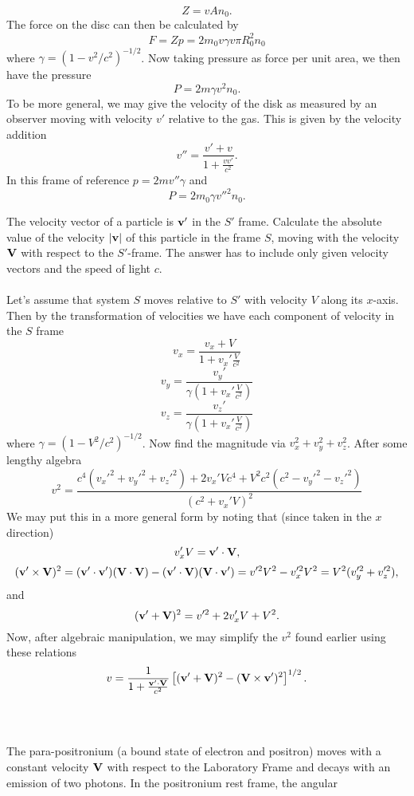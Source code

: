 \documentclass[10pt,letterpaper]{article}
\begin{document}
\[
	Z = vAn_0.
\]
The force on the disc can then be calculated by
\[
	F = Zp = 2m_0v\gamma v\pi R_0^2n_0
\]
where $\gamma = (1-v^2/c^2)^{-1/2}$. Now taking pressure as force per unit area, we then have the pressure
\[
	P = 2m\gamma v^2n_0.
\]
To be more general, we may give the velocity of the disk as measured by an observer moving with velocity $v'$
relative to the gas. This is given by the velocity addition 
\[
	v'' = \frac{v'+v}{1+\frac{vv'}{c^2}}.
\]
In this frame of reference $p = 2mv''\gamma$ and
\[
	P = 2m_0 \gamma v''^2 n_0.
\]
\item
The velocity vector of a particle is $\mathbf{v}'$ in the $S'$ frame. Calculate the absolute value of the velocity 
$|\mathbf{v}|$ of this particle in the frame $S$, moving with the velocity $\mathbf{V}$ with respect to the $S'$-frame. The 
answer has to include only given velocity vectors and the speed of light $c$. 
\\ \\
Let's assume that system $S$ moves relative to $S'$ with velocity $V$ along its $x$-axis. Then by 
the transformation of velocities we have each component of velocity in the $S$ frame
\[
	v_x  = \frac{v_x+V}{1+v_x'\frac{V}{c^2}}
\]
\[
	v_y = \frac{v_y'}{\gamma(1+v_x'\frac{V}{c^2})}
\]
\[
	v_z = \frac{v_z'}{\gamma(1+v_x'\frac{V}{c^2})}
\]
where $\gamma = (1-V^2/c^2)^{-1/2}$. Now find the magnitude via $v_x^2+v_y^2+v_z^2$. After some lengthy
algebra
\[
	v^2 = \frac{c^4(v_x'^2+v_y'^2+v_z'^2)+2v_x'Vc^4+V^2c^2(c^2-v_y'^2-v_z'^2)}{(c^2+v_x'V)^2}
\]
We may put this in a more general form by noting that (since taken in the $x$ direction)
\[
	v_x'V = \mathbf{v}'\cdot \mathbf{V},
\]
\[
	(\mathbf{v}'\times \mathbf{V})^2 = (\mathbf{v}'\cdot\mathbf{v}')(\mathbf{V}\cdot\mathbf{V})-(\mathbf{v}'\cdot\mathbf{V})(\mathbf{V}\cdot
	\mathbf{v}') = v'^2V^2-v_x'^2V^2 = V^2(v_y'^2+v_z'^2),
\]
and
\[
	(\mathbf{v}'+\mathbf{V})^2 = v'^2+2v_x'V+V^2.
\]
Now, after algebraic manipulation, we may simplify the $v^2$ found earlier using these relations
\[
	v = \frac{1}{1+\frac{\mathbf{v}'\cdot\mathbf{V}}{c^2}}\left[(\mathbf{v}'+\mathbf{V})^2-(\mathbf{V}\times\mathbf{v}')^2\right]^{1/2}.
\]
\\ \\
\item
The para-positronium (a bound state of electron and positron) moves with a constant velocity $\mathbf{V}$ with respect
to the Laboratory Frame and decays with an emission of two photons. In the positronium rest frame, the angular
\end{document}
